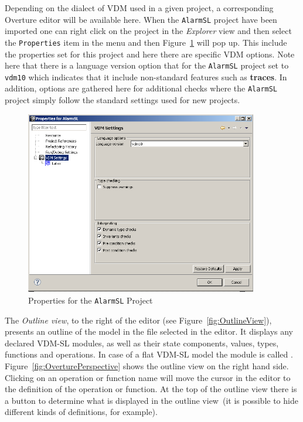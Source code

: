 Depending on the dialect of VDM used in a given project, a
corresponding Overture editor will be available here. When the
\texttt{AlarmSL} project have been imported one can right click on the
project in the \emph{Explorer} view and then select the
\texttt{Properties} item in the menu and then
Figure~\ref{fig:settings} will pop up. This include the properties set
for this project and here there are specific VDM options. Note here
that there is a language version option that for the \texttt{AlarmSL}
project set to \texttt{vdm10} which indicates that it include
non-standard features such as {\bf\ttfamily traces}. In addition,
options are gathered here for additional checks where the
\texttt{AlarmSL} project simply follow the standard settings used for
new projects.

\begin{figure}[!htb]
\begin{center}
  \includegraphics[width=4.0in]{figures/settings}
  \caption[labelInTOC]{Properties for the \texttt{AlarmSL} Project}
  \label{fig:settings}
\end{center}
\end{figure}


The \emph{Outline view}, to the right of the editor (see
Figure~\ref{fig:OutlineView}), presents an outline of the
model in the file selected in the editor. It displays any declared
VDM-SL modules, as well as their state components, values, types,
functions and operations. In case of a flat VDM-SL model the module is
called {}.
Figure~\ref{fig:OverturePerspective} shows the outline view
on the right hand side. Clicking on an operation or function name will
move the cursor in the editor to the definition of the operation or function. At
the top of the outline view there is a button to determine what is
displayed in the outline view~(it is possible to hide different kinds
of definitions, for
example).


